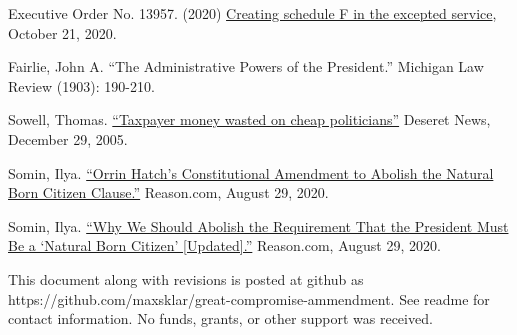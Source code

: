 \documentclass{article}
\newcommand{\quotes}[1]{``#1''}
\begin{document}
\begin{thebibliography}{20}
Executive Order No. 13957. (2020) \href{https://www.
federalregister.gov/documents/2020/10/26/2020-23780/creating-schedule-f-in-the-excepted-service}{Creating schedule F in the excepted service}, October 21, 2020.

Fairlie, John A. \quotes{The Administrative Powers of the President.} Michigan Law Review (1903): 190-210.

Sowell, Thomas. \href{https://www.deseret.com/2005/12/29/19930084/thomas-sowell-taxpayer-money-wasted-on-cheap-politicians}{\quotes{Taxpayer money wasted on cheap politicians}} Deseret News, December 29, 2005.

Somin, Ilya. \href{https://reason.com/volokh/2020/08/16/orrin-hatchs-constitutional-amendment-to-abolish-the-natural-born-citizen-clause/}{\quotes{Orrin Hatch’s Constitutional Amendment to Abolish the Natural Born Citizen Clause.}} Reason.com, August 29, 2020.

Somin, Ilya. \href{https://reason.com/volokh/2020/08/14/why-we-should-abolish-the-requirement-that-the-president-must-be-a-natural-born-citizen/}{\quotes{Why We Should Abolish the Requirement That the President Must Be a ‘Natural Born Citizen’ [Updated].}} Reason.com, August 29, 2020. 

\end{thebibliography}

This document along with revisions is posted at github as https://github.com/maxsklar/great-compromise-ammendment. See readme for contact information. No funds, grants, or other support was received.
\end{document}
